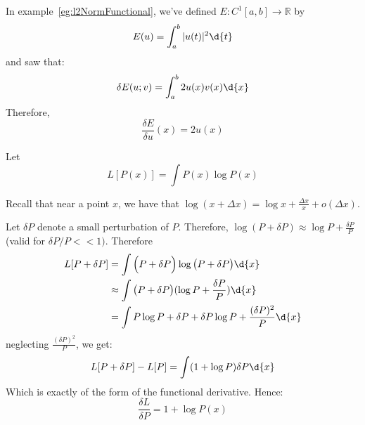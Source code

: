\documentclass{article}
\begin{document}
\begin{example} In example~\ref{eg:l2NormFunctional}, we've defined $E: C^{1}[a,b] \to \mathbb{R}$ by
\[
  E(u) = \int_{a}^{b} |u(t)| ^2 \d{t}
\]
and saw that:
\[
  \delta E(u ; v) =  \int_{a}^{b} 2 u(x) v(x) \d{x}
\]
Therefore, 
\[
  \frac{\delta E}{\delta u}(x) = 2 u(x)
\]

\end{example}

\begin{example} Let
  \[
    L[P(x)] = \int P(x) \log  P(x)
  \]

Recall that near a point $x$, we have that $\log (x+ \Delta x) = \log x + \frac{\Delta x}{x} + o (\Delta x)$. 

  Let $\delta P$ denote a small perturbation of $P$.   Therefore, $\log  (P + \delta P)  \approx \log  P + \frac{\delta P}{P}$ (valid for $\delta P / P << 1)$. Therefore
\begin{align*}
  L[P + \delta P] &= \int \Big( P + \delta P \Big)  \log  \big( P + \delta P \big) \d{x} \\
  & \approx \int \big( P + \delta P \big) (\log  P + \frac{\delta P}{P}) \d{x} \\
  &= \int P \log  P  + \delta P + \delta P \log P + \frac{(\delta P) ^2}{P}  \d{x}
\end{align*}
  neglecting $\frac{(\delta P) ^2}{P}$, we get:
\[
  L[P + \delta P] - L[P] =  \int (1 + \log P) \delta P \d{x}
\]
Which is exactly of the form of the functional derivative. Hence:
\[
  \frac{\delta L}{\delta P} = 1 + \log P(x)
\]


\end{example}
\end{document}
